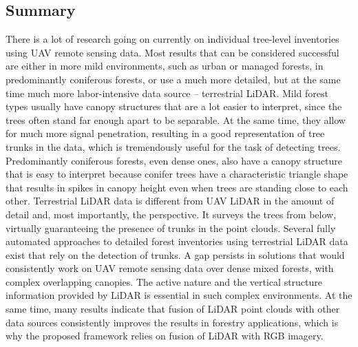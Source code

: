 \subsection{Summary}

There is a lot of research going on currently on individual tree-level inventories using UAV remote sensing data.
Most results that can be considered successful are either in more mild environments, such as urban or managed forests, in predominantly coniferous forests, or use a much more detailed, but at the same time much more labor-intensive data source – terrestrial LiDAR.
Mild forest types usually have canopy structures that are a lot easier to interpret, since the trees often stand far enough apart to be separable.
At the same time, they allow for much more signal penetration, resulting in a good representation of tree trunks in the data, which is tremendously useful for the task of detecting trees.
Predominantly coniferous forests, even dense ones, also have a canopy structure that is easy to interpret because conifer trees have a characteristic triangle shape that results in spikes in canopy height even when trees are standing close to each other.
Terrestrial LiDAR data is different from UAV LiDAR in the amount of detail and, most importantly, the perspective.
It surveys the trees from below, virtually guaranteeing the presence of trunks in the point clouds.
Several fully automated approaches to detailed forest inventories using terrestrial LiDAR data exist that rely on the detection of trunks.
A gap persists in solutions that would consistently work on UAV remote sensing data over dense mixed forests, with complex overlapping canopies.
The active nature and the vertical structure information provided by LiDAR is essential in such complex environments.
At the same time, many results indicate that fusion of LiDAR point clouds with other data sources consistently improves the results in forestry applications, which is why the proposed framework relies on fusion of LiDAR with RGB imagery.
